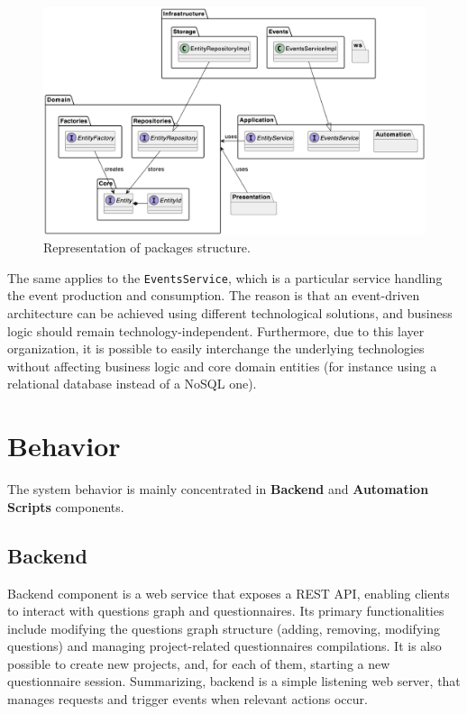 \documentclass[12pt,a4paper,openright,twoside]{book}
\begin{document}
\begin{figure}
    \centering
    \includegraphics[width=\linewidth]{figures/diagrams/packages.png}
    \caption{
        Representation of packages structure.
    }
    \label{fig:packages}
\end{figure}

The same applies to the \texttt{EventsService}, which is a particular service handling the event production and consumption.
%
The reason is that an event-driven architecture can be achieved using different technological solutions, and business logic should remain technology-independent.
%
Furthermore, due to this layer organization, it is possible to easily interchange the underlying technologies without affecting business logic and core domain entities (for instance using a relational database instead of a NoSQL one).


\section{Behavior}

The system behavior is mainly concentrated in \textbf{Backend} and \textbf{Automation Scripts} components.

\subsection{Backend}

Backend component is a web service that exposes a REST \ac{API}, enabling clients to interact with questions graph and questionnaires.
%
Its primary functionalities include modifying the questions graph structure (adding, removing, modifying questions) and managing project-related questionnaires compilations.
%
It is also possible to create new projects, and, for each of them, starting a new questionnaire session.
%
Summarizing, backend is a simple listening web server, that manages requests and trigger events when relevant actions occur.
\end{document}
